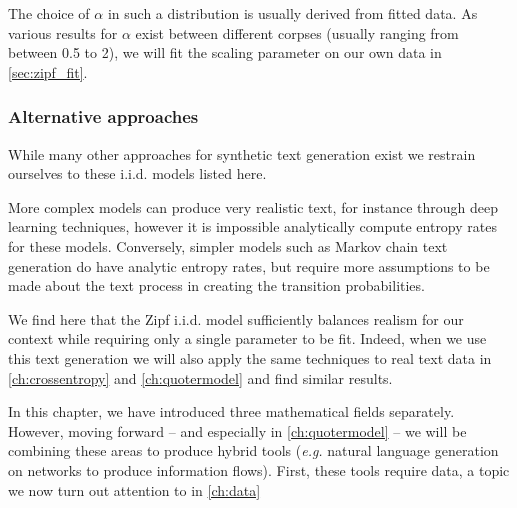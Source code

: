 The choice of $\alpha$ in such a distribution is usually derived from fitted data. As various results for $\alpha$ exist between different corpses (usually ranging from between 0.5 to 2), we will fit the scaling parameter on our own data in \autoref{sec:zipf_fit}.

\subsubsection{Alternative approaches}
While many other approaches for synthetic text generation exist we restrain ourselves to these i.i.d. models listed here. 

More complex models can produce very realistic text, for instance through deep learning techniques, however it is impossible analytically compute entropy rates for these models. Conversely, simpler models such as Markov chain text generation do have analytic entropy rates, but require more assumptions to be made about the text process in creating the transition probabilities. 

We find here that the Zipf i.i.d. model sufficiently balances realism for our context while requiring only a single parameter to be fit. Indeed, when we use this text generation we will also apply the same techniques to real text data in \autoref{ch:crossentropy} and \autoref{ch:quotermodel} and find similar results. 


In this chapter, we have introduced three mathematical fields separately. However, moving forward -- and especially in \autoref{ch:quotermodel} -- we will be combining these areas to produce hybrid tools (\emph{e.g.}  natural language generation on networks to produce information flows). First, these tools require data, a topic we now turn out attention to in \autoref{ch:data}

